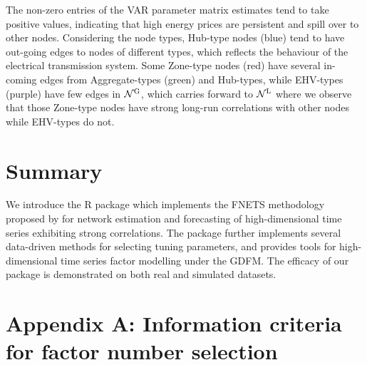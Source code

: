 The non-zero entries of the VAR parameter matrix estimates tend to take positive values, indicating that high energy prices are persistent and spill over to other nodes.
Considering the node types, Hub-type nodes (blue) tend to have out-going edges to nodes of different types, which reflects the behaviour of the electrical transmission system.
Some Zone-type nodes (red) have several in-coming edges from Aggregate-types (green) and Hub-types, while EHV-types (purple) have few edges in $\mathcal N^{\text{\upshape{G}}}$, which carries forward to $\mathcal N^{\text{\upshape{L}}}$ where we observe that those Zone-type nodes have strong long-run correlations with other nodes while EHV-types do not.
 
\section{Summary}
\label{sec:summary}

We introduce the R package  which implements the FNETS methodology proposed by \cite{barigozzi2022fnets} for network estimation and forecasting of high-dimensional time series exhibiting strong correlations. 
The package further implements several data-driven methods for selecting tuning parameters, and provides tools for high-dimensional time series factor modelling under the GDFM. 
The efficacy of our package is demonstrated on both
real and simulated datasets.

\appendix

\section{Appendix A: Information criteria for factor number selection}
\label{sec:factornumber}


